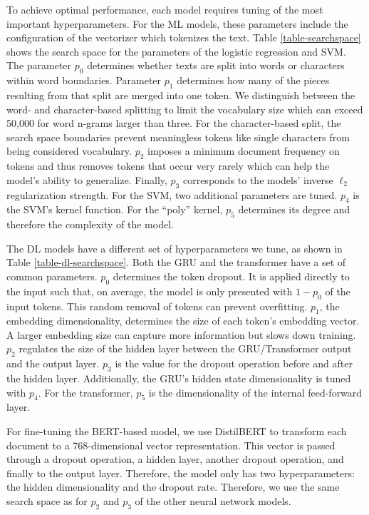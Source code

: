 To achieve optimal performance, each model requires tuning of the most important hyperparameters. For the ML models, these parameters include the configuration of the vectorizer which tokenizes the text. Table \ref{table-searchspace} shows the search space for the parameters of the logistic regression and SVM. The parameter $p_0$ determines whether texts are split into words or characters within word boundaries. Parameter $p_1$ determines how many of the pieces resulting from that split are merged into one token. We distinguish between the word- and character-based splitting to limit the vocabulary size which can exceed 50,000 for word n-grams larger than three. For the character-based split, the search space boundaries prevent meaningless tokens like single characters from being considered vocabulary. $p_2$ imposes a minimum document frequency on tokens and thus removes tokens that occur very rarely which can help the model's ability to generalize. Finally, $p_3$ corresponds to the models' inverse $\ell_2$ regularization strength. For the SVM, two additional parameters are tuned. $p_4$ is the SVM's kernel function. For the ``poly'' kernel, $p_5$ determines its degree and therefore the complexity of the model.



The DL models have a different set of hyperparameters we tune, as shown in Table \ref{table-dl-searchspace}. Both the GRU and the transformer have a set of common parameters. $p_0$ determines the token dropout. It is applied directly to the input such that, on average, the model is only presented with $1 - p_0$ of the input tokens. This random removal of tokens can prevent overfitting. $p_1$, the embedding dimensionality, determines the size of each token's embedding vector. A larger embedding size can capture more information but slows down training. $p_2$ regulates the size of the hidden layer between the GRU/Transformer output and the output layer. $p_3$ is the value for the dropout operation before and after the hidden layer. Additionally, the GRU's hidden state dimensionality is tuned with $p_4$. For the transformer, $p_5$ is the dimensionality of the internal feed-forward layer.



For fine-tuning the BERT-based model, we use DistilBERT  to transform each document to a 768-dimensional vector representation. This vector is passed through a dropout operation, a hidden layer, another dropout operation, and finally to the output layer. Therefore, the model only has two hyperparameters: the hidden dimensionality and the dropout rate. Therefore, we use the same search space as for $p_2$ and $p_3$ of the other neural network models.

